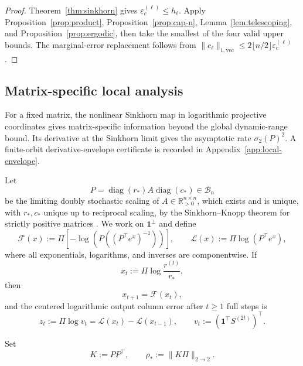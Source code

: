 \documentclass[10pt]{article}
\numberwithin{equation}{section}
\theoremstyle{plain}
\theoremstyle{definition}
\theoremstyle{remark}
\newcommand{\R}{\mathbb{R}}
\newcommand{\ones}{\mathbf{1}}
\newcommand{\cB}{\mathcal{B}}
\newcommand{\diag}{\operatorname{diag}}
\begin{document}
\begin{proof}
Theorem~\ref{thm:sinkhorn} gives
\(\varepsilon_c^{(\ell)}\le h_\ell\). Apply
Proposition~\ref{prop:product}, Proposition~\ref{prop:cap-n},
Lemma~\ref{lem:telescoping}, and Proposition~\ref{prop:ergodic}, then take the
smallest of the four valid upper bounds. The marginal-error replacement follows
from
\(\|c_\ell\|_{1,\mathrm{vec}}
\le2\lfloor n/2\rfloor\varepsilon_c^{(\ell)}\).
\end{proof}


\subsection{Matrix-specific local analysis}\label{subsec:local-spectral}

For a fixed matrix, the nonlinear Sinkhorn map in logarithmic projective
coordinates gives matrix-specific information beyond the global dynamic-range
bound. Its derivative at the Sinkhorn limit gives the asymptotic rate
\(\sigma_2(P)^2\). A finite-orbit derivative-envelope certificate is recorded in
Appendix~\ref{app:local-envelope}.

Let
\[
        P=\diag(r_*)A\diag(c_*)\in\cB_n
\]
be the limiting doubly stochastic scaling of $A\in\R_{>0}^{n\times n}$, which exists and
is unique, with $r_*,c_*$ unique up to reciprocal scaling, by the Sinkhorn--Knopp theorem
for strictly positive matrices \citep{SinkhornKnopp1967}. We work on
$\ones^\perp$ and define
\begin{equation}\label{eq:F-L-defs}
        \mathcal F(x)
        :=
        \Pi\left[-\log\left(P\left((P^\top e^x)^{-1}\right)\right)\right],
        \qquad
        \mathcal L(x)
        :=
        \Pi\log(P^\top e^x),
\end{equation}
where all exponentials, logarithms, and inverses are componentwise. If
\[
        x_t:=\Pi\log\frac{r^{(t)}}{r_*},
\]
then
\begin{equation}\label{eq:exact-log-coordinate-recursion}
        x_{t+1}=\mathcal F(x_t),
\end{equation}
and the centered logarithmic output column error after $t\ge1$ full steps is
\begin{equation}\label{eq:exact-log-column-error}
        z_t:=\Pi\log v_t
        =
        \mathcal L(x_t)-\mathcal L(x_{t-1}),
        \qquad
        v_t:=(\ones^\top S^{(2t)})^\top.
\end{equation}

Set
\[
        K:=PP^\top,\qquad \rho_*:=\|K\Pi\|_{2\to2}.
\]
\end{document}
